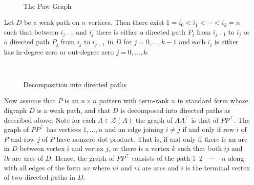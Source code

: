 \documentclass[preprint,12pt]{elsarticle}
\newcommand{\trans  }{^\top}
\begin{document}
\begin{figure}
\begin{center}
\\
\caption{The Paw Graph}
\label{paw}
\end{center}
\end{figure}

Let $D$ be a weak path on  $n$ vertices. 
Then there exist $1=i_0 <i_1< \cdots <i_k=n$
such that between $i_{j-1}$ and $i_j$ there 
is either a directed path $P_j$ from $i_{j-1}$ 
to $i_j$ or a directed path $P_j$ from $i_{j}$ to $i_{j+1}$ in $D$ for $j=0, \ldots, k-1$ and each $i_j$ is either has in-degree zero or 
out-degree zero $j=0,\ldots, k$.

\begin{center}
\begin{figure}
\\
\caption{
 Decomposition into directed paths}
\label{zigzag}
\end{figure}
\end{center}

Now assume that $P$ is an $n\times n$ pattern 
with term-rank $n$ in standard form whose digraph $D$ is a weak path, 
and that  $D$ is decomposed into
directed paths as described above. 
Note for each $A \in \mathcal{Z}(A)$ the graph of $AA\trans$ 
is that of $PP\trans$. The graph 
of $PP\trans$ has vertices $1,\ldots, n$ 
and an edge joining $i\neq j$ if and only if 
row $i$ of $P$ and row $j$ of $P$ have nonzero 
dot-product. That is, if and only if there is an arc in $D$ between vertex $i$ and vertex $j$,  or there is a vertex $k$ such that both $ij$ and $ik$ are arcs of $D$. Hence, the 
graph of $PP\trans$ consists of the path 
$1$--$2$---$\cdots$---$n$ along with all edges of the form $uv$ where $ui$ and $vi$ are arcs
and $i$ is the terminal vertex of two directed paths in $D$. 
\end{document}
